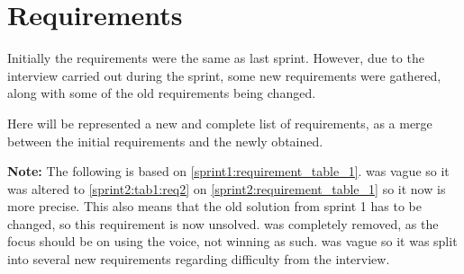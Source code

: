 \section{Requirements}\label{s2requirements}
Initially the requirements were the same as last sprint.
However, due to the interview carried out during the sprint, some new requirements were gathered, along with some of the old requirements being changed.

Here will be represented a new and complete list of requirements, as a merge between the initial requirements and the newly obtained.

\textbf{Note:} The following is based on \cref{sprint1:requirement_table_1}.
  was vague so it was altered to \cref{sprint2:tab1:req2} on \cref{sprint2:requirement_table_1} so it now is more precise.
This also means that the old solution from sprint 1 has to be changed, so this requirement is now unsolved.
 was completely removed, as the focus should be on using the voice, not winning as such.
 was vague so it was split into several new requirements regarding difficulty from the interview.
